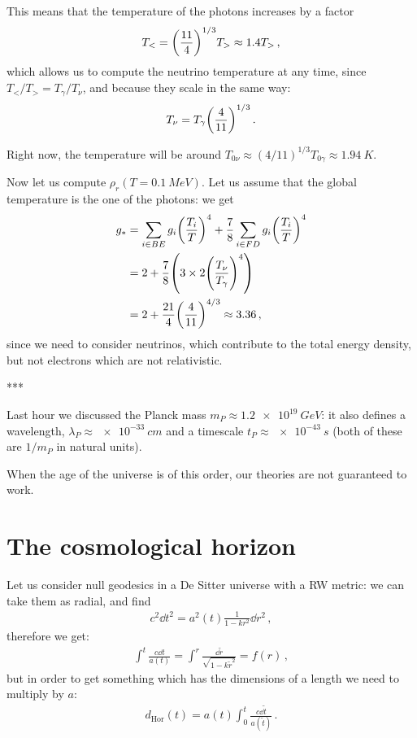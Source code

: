 \documentclass[main.tex]{subfiles}
\begin{document}
This means that the temperature of the photons increases by a factor
%
\begin{equation}
  T_{<} = \qty(\frac{11}{4})^{1/3} T_{>} \approx \num{1.4} T_>
\,,
\end{equation}
%
which allows us to compute the neutrino temperature at any time, since \(T_< / T_> = T_\gamma / T_\nu \), and because they scale in the same way:
%
\begin{equation}
  T_{\nu } = T_{\gamma } \qty(\frac{4}{11})^{1/3}
\,.
\end{equation}

Right now, the temperature will be around \(T_{0 \nu } \approx (4/11)^{1/3} T_{0 \gamma } \approx \SI{1.94}{K} \). 


Now let us compute \(\rho_{r} (T = \SI{0.1}{MeV})\).
Let us assume that the global temperature is the one of the photons: we get 
%
\begin{subequations}
\begin{align}
  g_{*} &=  \sum _{i \in BE} g_i \qty(\frac{T_i}{T})^{4} + 
  \frac{7}{8}\sum _{i \in FD} g_i \qty(\frac{T_i}{T})^{4}  \\
  &= 2 + \frac{7}{8} \qty(3 \times 2 \qty(\frac{T_{\nu }}{T_{\gamma }})^{4})  \\
  &= 2 + \frac{21}{4} \qty(\frac{4}{11})^{4/3} \approx 3.36
\,,
\end{align}
\end{subequations}
%
since we need to consider neutrinos, which contribute to the total energy density, but not electrons which are not relativistic.

\medskip
\begin{center}
    ***
\end{center}
\medskip

Last hour we discussed the Planck mass \(m_P \approx \SI{1.2e19}{GeV}\): it also defines a wavelength, \(\lambda_{P} \approx \SI{e-33}{cm}\) and a timescale \(t_{P} \approx \SI{e-43}{s}\) (both of these are \(1/m_P\) in natural units).

When the age of the universe is of this order, our theories are not guaranteed to work. 

\section{The cosmological horizon}

Let us consider null geodesics in a De Sitter universe with a RW metric: we can take them as radial, and find 
%
\begin{align}
  c^2 \dd{t^2} = a^2(t) \frac{1}{1-kr^2} \dd{r^2} 
\,,
\end{align}
%
therefore we get: 
%
\begin{align}
  \int^{t} \frac{c \dd{t}}{a(t)} = \int^r \frac{ \dd{\widetilde{r}} }{\sqrt{1-k \widetilde{r}^2}} = f(r)
\,,
\end{align}
%
but in order to get something which has the dimensions of a length we need to multiply by \(a\): 
%
\begin{align}
  d _{\text{Hor}} (t) = a(t) \int_0^{t} \frac{c \dd{\widetilde{t}}}{a(\widetilde{t})}
\,.
\end{align}
\end{document}

